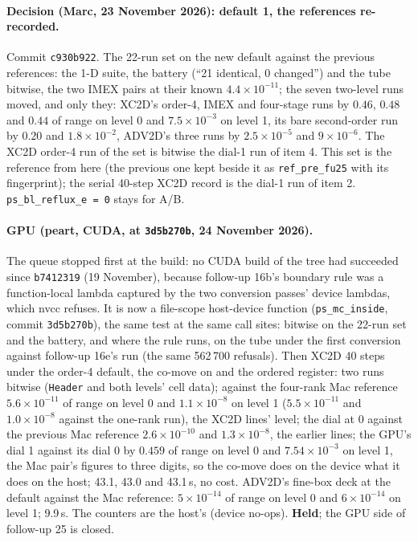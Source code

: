 \documentclass[11pt,a4paper]{article}
\newcommand{\code}[1]{\texttt{\small #1}}
\begin{document}
\paragraph{Decision (Marc, 23 November 2026): default 1, the references
re-recorded.}  Commit \code{c930b922}.  The 22-run set on the new
default against the previous references: the 1-D suite, the battery
(``21 identical, 0 changed'') and the tube bitwise, the two IMEX pairs
at their known $4.4\times10^{-11}$; the seven two-level runs moved, and
only they: XC2D's order-4, IMEX and four-stage runs by $0.46$, $0.48$
and $0.44$ of range on level 0 and $7.5\times10^{-3}$ on level 1, its
bare second-order run by $0.20$ and $1.8\times10^{-2}$, ADV2D's three
runs by $2.5\times10^{-5}$ and $9\times10^{-6}$.  The XC2D order-4 run
of the set is bitwise the dial-1 run of item 4.  This set is the
reference from here (the previous one kept beside it as
\code{ref\_pre\_fu25} with its fingerprint); the serial 40-step XC2D
record is the dial-1 run of item 2.  \code{ps\_bl\_reflux\_e = 0}
stays for A/B.

\paragraph{GPU (peart, CUDA, at \code{3d5b270b}, 24 November 2026).}
The queue stopped first at the build: no CUDA build of the tree had
succeeded since \code{b7412319} (19 November), because follow-up 16b's
boundary rule was a function-local lambda captured by the two
conversion passes' device lambdas, which nvcc refuses.  It is now a
file-scope host-device function (\code{ps\_mc\_inside}, commit
\code{3d5b270b}), the same test at the same call sites: bitwise on the
22-run set and the battery, and where the rule runs, on the tube under
the first conversion against follow-up 16e's run (the same 562\,700
refusals).  Then XC2D 40 steps under the order-4 default, the co-move
on and the ordered register: two runs bitwise (\code{Header} and both
levels' cell data); against the four-rank Mac reference
$5.6\times10^{-11}$ of range on level 0 and $1.1\times10^{-8}$ on
level 1 ($5.5\times10^{-11}$ and $1.0\times10^{-8}$ against the
one-rank run), the XC2D lines' level; the dial at 0 against the
previous Mac reference $2.6\times10^{-10}$ and $1.3\times10^{-8}$, the
earlier lines; the GPU's dial 1 against its dial 0 by $0.459$ of range
on level 0 and $7.54\times10^{-3}$ on level 1, the Mac pair's figures
to three digits, so the co-move does on the device what it does on
the host; 43.1, 43.0 and 43.1\,s, no cost.  ADV2D's fine-box deck at
the default against the Mac reference: $5\times10^{-14}$ of range on level 0 and
$6\times10^{-14}$ on level 1; 9.9\,s.  The counters are the host's (device
no-ops).  \textbf{Held}; the GPU side of follow-up 25 is closed.
\end{document}
